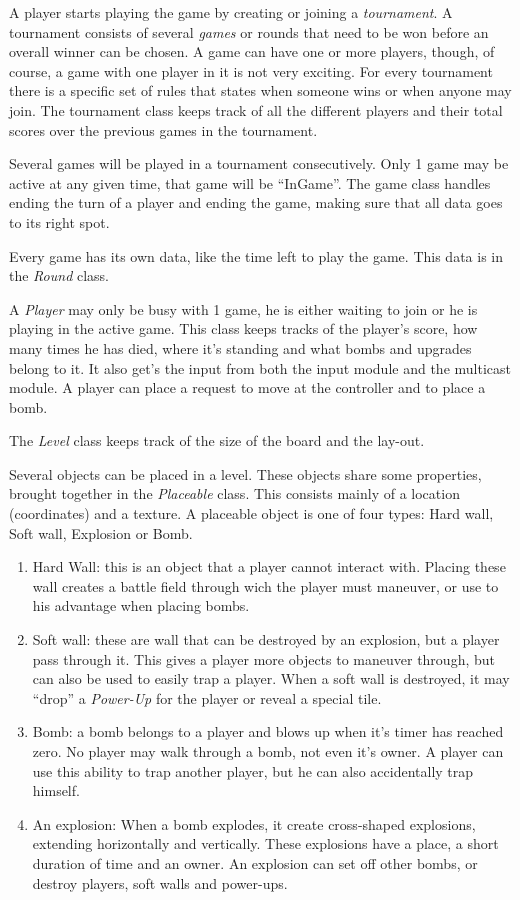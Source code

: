       \newpage

      A player starts playing the game by creating or joining a \emph{tournament}. A tournament consists of several \emph{games} or rounds that need to be won before an overall winner can be chosen. A game can have one or more players, though, of course, a game with one player in it is not very exciting. For every tournament there is a specific set of rules that states when someone wins or when anyone may join. The tournament class keeps track of all the different players and their total scores over the previous games in the tournament.

      Several games will be played in a tournament consecutively. Only 1 game may be active at any given time, that game will be ``InGame''. The game class handles ending the turn of a player and ending the game, making sure that all data goes to its right spot.

      Every game has its own data, like the time left to play the game. This data is in the \emph{Round} class.

      A \emph{Player} may only be busy with 1 game, he is either waiting to join or he is playing in the active game. This class keeps tracks of the player's score, how many times he has died, where it's standing and what bombs and upgrades belong to it. It also get's the input from both the input module and the multicast module. A player can place a request to move at the controller and to place a bomb.

      The \emph{Level} class keeps track of the size of the board and the lay-out.

      Several objects can be placed in a level. These objects share some properties, brought together in the \emph{Placeable} class. This consists mainly of a location (coordinates) and a texture. A placeable object is one of four types: Hard wall, Soft wall, Explosion or Bomb.\\
        \begin{enumerate}
          \item Hard Wall: this is an object that a player cannot interact with. Placing these wall creates a battle field through wich the player must maneuver, or use to his advantage when placing bombs.
          \item Soft wall: these are wall that can be destroyed by an explosion, but a player pass through it. This gives a player more objects to maneuver through, but can also be used to easily trap a player. When a soft wall is destroyed, it may ``drop'' a \emph{Power-Up} for the player or reveal a special tile.
          \item Bomb: a bomb belongs to a player and blows up when it's timer has reached zero. No player may walk through a bomb, not even it's owner. A player can use this ability to trap another player, but he can also accidentally trap himself.
          \item An explosion: When a bomb explodes, it create cross-shaped explosions, extending horizontally and vertically. These explosions have a place, a short duration of time and an owner. An explosion can set off other bombs, or destroy players, soft walls and power-ups.
        \end{enumerate}

